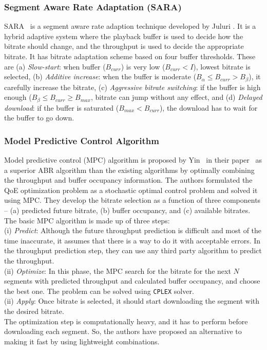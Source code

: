 \subsubsection{Segment Aware Rate Adaptation (SARA)}
SARA~\cite{7247436} is a segment aware rate adaption technique developed by Juluri \etal. It is a hybrid adaptive system where the playback buffer is used to decide how the bitrate should change, and the throughput is used to decide the appropriate bitrate. It has bitrate adaptation scheme based on four buffer thresholds. These are (a) \textit{Slow-start}: when buffer ($B_{curr}$) is very low ($B_{curr}<I$), lowest bitrate is selected, (b) \textit{Additive increase}: when the buffer is moderate ($B_{\alpha} \le B_{curr} > B_{\beta}$), it carefully increase the bitrate, (c) \textit{Aggressive bitrate switching}: if the buffer is high enough ($B_{\beta} \le B_{curr} \ge B_{max}$, bitrate can jump without any effect, and (d) \textit{Delayed download}: if the buffer is saturated ($B_{max} < B_{curr}$), the download has to wait for the buffer to go down.

\subsubsection{Model Predictive Control Algorithm}
Model predictive control (MPC) algorithm is proposed by Yin \etal\ in their paper~\cite{yin2015control,10.1145/2670518.2673877} as a superior \ac{ABR} algorithm than the existing algorithms by optimally combining the throughput and buffer occupancy information. The authors formulated the QoE optimization problem as a stochastic optimal control problem and solved it using MPC. They develop the bitrate selection as a function of three components -- (a) predicted future bitrate, (b) buffer occupancy, and (c) available bitrates. The basic MPC algorithm is made up of three steps: \\
(i) \textit{Predict}: Although the future throughput prediction is difficult and most of the time inaccurate, it assumes that there is a way to do it with acceptable errors. In the throughput prediction step, they can use any third party algorithm to predict the throughput.\\
(ii) \textit{Optimize}: In this phase, the MPC search for the bitrate for the next $N$ segments with predicted throughput and calculated buffer occupancy, and choose the best one. The problem can be solved using {\tt CPLEX} solver.\\
(ii) \textit{Apply}: Once bitrate is selected, it should start downloading the segment with the desired bitrate.\\
The optimization step is computationally heavy, and it has to perform before downloading each segment. So, the authors have proposed an alternative to making it fast by using lightweight combinations.


